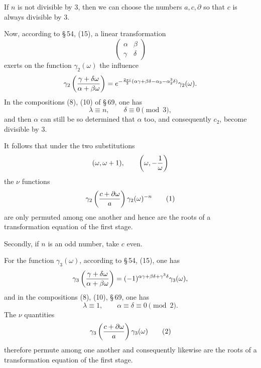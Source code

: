 \documentclass[11pt]{article}
\begin{document}
If $n$ is not divisible by $3$, then we can choose the numbers $a,c,\partial$ so that $c$ is always divisible by $3$.

Now, according to \S\,54, (15), a linear transformation
\[
\begin{pmatrix}\alpha&\beta\\ \gamma&\delta\end{pmatrix}
\]
exerts on the function $\gamma_2(\omega)$ the influence
\[
 \gamma_2\left({\gamma+\delta\omega\over\alpha+\beta\omega}\right)
 =e^{-{2\pi i\over3}(\alpha\gamma+\beta\delta-\alpha_3-\alpha_2^3\delta)}\gamma_2(\omega).
\]
In the compositions (8), (10) of \S\,69, one has
\[
 \lambda\equiv n,
 \qquad
 \delta\equiv0\pmod 3,
\]
and then $\alpha$ can still be so determined that $\alpha$ too, and consequently $c_2$, become divisible by $3$.

It follows that under the two substitutions
\[
 (\omega,\omega+1),
 \qquad
 \left(\omega,-{1\over\omega}\right)
\]
the $\nu$ functions
\begin{equation}
 \gamma_2\left({c+\partial\omega\over a}\right)\gamma_2(\omega)^{-n}
\tag{1}
\end{equation}
are only permuted among one another and hence are the roots of a transformation equation of the first stage.

Secondly, if $n$ is an odd number, take $c$ even.

For the function $\gamma_3(\omega)$, according to \S\,54, (15), one has
\[
 \gamma_3\left({\gamma+\delta\omega\over\alpha+\beta\omega}\right)
 =(-1)^{\alpha\gamma+\beta\delta+\gamma^3\delta}\gamma_3(\omega),
\]
and in the compositions (8), (10), \S\,69, one has
\[
 \lambda\equiv1,
 \qquad
 \alpha\equiv\delta\equiv0\pmod 2.
\]
The $\nu$ quantities
\begin{equation}
 \gamma_3\left({c+\partial\omega\over a}\right)\gamma_3(\omega)
\tag{2}
\end{equation}
therefore permute among one another and consequently likewise are the roots of a transformation equation of the first stage.
\end{document}
